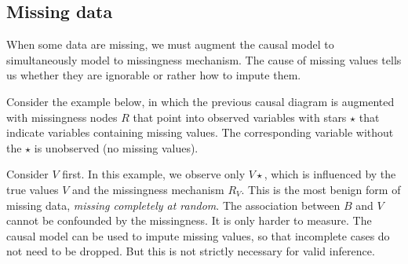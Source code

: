 \documentclass[reqno ,11pt]{amsart}
\begin{document}
\subsection{Missing data}

When some data are missing, we must augment the causal model to simultaneously model to missingness mechanism. The cause of missing values tells us whether they are ignorable or rather how to impute them.

Consider the example below, in which the previous causal diagram is augmented with missingness nodes $R$ that point into observed variables with stars $\star$ that indicate variables containing missing values. The corresponding variable without the $\star$ is unobserved (no missing values). 

\begin{center}
  \end{center}

Consider $V$ first. In this example, we observe only $V\star$, which is influenced by the true values $V$ and the missingness mechanism $R_V$. This is the most benign form of missing data, \emph{missing completely at random}. The association between $B$ and $V$ cannot be confounded by the missingness. It is only harder to measure. The causal model can be used to impute missing values, so that incomplete cases do not need to be dropped. But this is not strictly necessary for valid inference.
\end{document}
